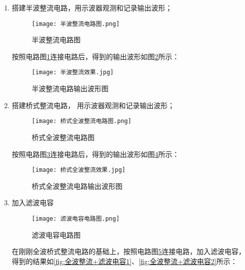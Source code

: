 \documentclass[dvipsnames, svgnames,a4paper,11pt]{article}
\begin{document}
		\begin{enumerate}
			\item 搭建半波整流电路，用示波器观测和记录输出波形；
			
				\begin{figure}[htbp]
					\centering
					\texttt{[image: 半波整流电路图.png]}
					\caption{半波整流电路图}
					\label{fig:半波整流电路图}
				\end{figure}

				按照电路图\cref{fig:半波整流电路图}连接电路后，得到的输出波形如图\cref{fig:半波整流}所示：

				\begin{figure}[htbp]
					\centering
					\texttt{[image: 半波整流效果.jpg]}
					\caption{半波整流电路输出波形图}
					\label{fig:半波整流}
				\end{figure}





			\item 搭建桥式整流电路， 用示波器观测和记录输出波形；
			
				\begin{figure}[htbp]
					\centering
					\texttt{[image: 桥式全波整流电路图.png]}
					\caption{桥式全波整流电路图}
					\label{fig:桥式全波整流电路图}
				\end{figure}


				按照电路图\cref{fig:桥式全波整流电路图}连接电路后，得到的输出波形如图\cref{fig:全波整流}所示：


				\begin{figure}[htbp]
					\centering
					\texttt{[image: 桥式全波整流效果.jpg]}
					\caption{桥式全波整流电路输出波形图}
					\label{fig:全波整流}
				\end{figure}







			\item 加入滤波电容
			
				\begin{figure}[htbp]
					\centering
					\texttt{[image: 滤波电容电路图.png]}
					\caption{滤波电容电路图}
					\label{fig:滤波电容电路图}
				\end{figure}


				在刚刚全波桥式整流电路的基础上，按照电路图\cref{fig:滤波电容电路图}连接电路，加入滤波电容，得到的结果如\cref{fig:全波整流+滤波电容1}、\cref{fig:全波整流+滤波电容2}所示：


\end{enumerate}
\end{document}
